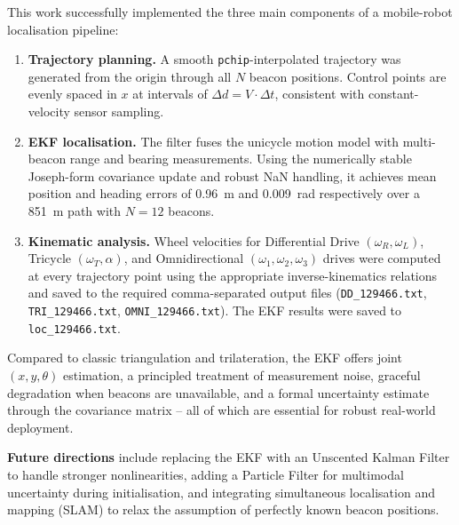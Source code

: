\documentclass[a4paper,11pt]{report}
\begin{document}
This work successfully implemented the three main components of a mobile-robot localisation pipeline:

\begin{enumerate}
  \item \textbf{Trajectory planning.}  A smooth \texttt{pchip}-interpolated trajectory was generated from the origin through all $N$ beacon positions.  Control points are evenly spaced in $x$ at intervals of $\Delta d = V \cdot \Delta t$, consistent with constant-velocity sensor sampling.

  \item \textbf{EKF localisation.}  The filter fuses the unicycle motion model with multi-beacon range and bearing measurements.  Using the numerically stable Joseph-form covariance update and robust NaN handling, it achieves mean position and heading errors of \SI{0.96}{\metre} and \SI{0.009}{\radian} respectively over a \SI{851}{\metre} path with $N = 12$ beacons.

  \item \textbf{Kinematic analysis.}  Wheel velocities for Differential Drive $(\omega_R, \omega_L)$, Tricycle $(\omega_T, \alpha)$, and Omnidirectional $(\omega_1, \omega_2, \omega_3)$ drives were computed at every trajectory point using the appropriate inverse-kinematics relations and saved to the required comma-separated output files (\texttt{DD\_129466.txt}, \texttt{TRI\_129466.txt}, \texttt{OMNI\_129466.txt}).  The EKF results were saved to \texttt{loc\_129466.txt}.
\end{enumerate}

Compared to classic triangulation and trilateration, the EKF offers joint $(x, y, \theta)$ estimation, a principled treatment of measurement noise, graceful degradation when beacons are unavailable, and a formal uncertainty estimate through the covariance matrix -- all of which are essential for robust real-world deployment.

\medskip\noindent
\textbf{Future directions} include replacing the EKF with an Unscented Kalman Filter to handle stronger nonlinearities, adding a Particle Filter for multimodal uncertainty during initialisation, and integrating simultaneous localisation and mapping (SLAM) to relax the assumption of perfectly known beacon positions.
\end{document}
